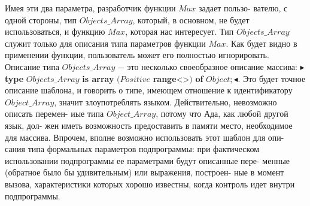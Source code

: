 \documentclass{./git_rep/mai_prac_2017/template/mai_book}
\begin{document}
Имея эти два параметра, разработчик функции $Max$ задает пользо-\linebreak
вателю, с одной стороны, тип $Objects\_Array$, который, в основном, не\linebreak
будет использоваться,  и функцию $Max$, которая нас интересует.  Тип\linebreak
$Objects\_Array$ служит только для описания типа параметров функции\linebreak
$Max$. Как будет видно в применении функции, пользователь может его\linebreak
полностью игнорировать. Описание типа $Objects\_Array$ $-$ это несколько\linebreak
своеобразное описание массива: $\blacktriangleright$ \textbf{type} $Objects\_Array$ \textbf{is array} $(Positive$\linebreak
\textbf{range}<>$)$ \textbf{of} $Object;\blacktriangleleft$. Это будет точное описание шаблона, и говорить\linebreak
о типе, имеющем отношение к идентификатору $Object\_Array$, значит\linebreak
злоупотреблять языком. Действительно, невозможно описать перемен-\linebreak
иые типа $Object\_Array$, потому что Ада, как любой другой язык, дол-\linebreak
жен иметь возможность предоставить в памяти место, необходимое для\linebreak
массива. Впрочем, вполне возможно использовать этот шаблон для опи-\linebreak
сания типа формальных параметров подпрограммы: при фактическом\linebreak
использовании подпрограммы ее параметрами будут описанные пере-\linebreak
менные (обратное было бы удивительным) или выражения, построен-\linebreak
ные в момент вызова, характеристики которых хорошо известны, когда\linebreak
контроль идет внутри подпрограммы.\\
\end{document}

